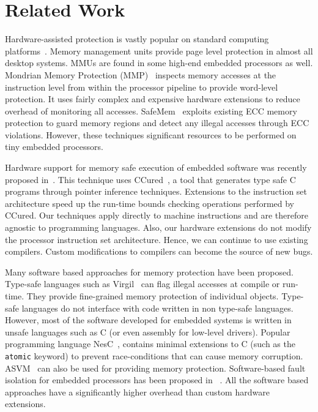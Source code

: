 \section{Related Work}
\label{sec:related}
%
Hardware-assisted protection is vastly popular on standard computing platforms~\cite{qin-hpca05-safemem, witchel-asplos02-mondrian}. 
%
Memory management units provide page level protection in almost all desktop systems.
%
MMUs are found in some high-end embedded processors as well.
%
Mondrian Memory Protection (MMP)~\cite{witchel-asplos02-mondrian} inspects memory accesses at the instruction level from within the processor pipeline to provide word-level protection.
%
It uses fairly complex and expensive hardware extensions to reduce overhead of monitoring all accesses.
%
SafeMem~\cite{qin-hpca05-safemem} exploits existing ECC memory protection to guard memory regions and detect any illegal accesses through ECC violations.
%
However, these techniques significant resources to be performed on tiny embedded processors.

%
Hardware support for memory safe execution of embedded software was recently proposed in~\cite{divya06codes}.
%
This technique uses CCured~\cite{ccured02necula}, a tool that generates type safe C programs through pointer inference techniques.
%
Extensions to the instruction set architecture speed up the run-time bounds checking operations performed by CCured.
%
Our techniques apply directly to machine instructions and are therefore agnostic to programming languages.
%
Also, our hardware extensions do not modify the processor instruction set architecture.
%
Hence, we can continue to use existing compilers.
%
Custom modifications to compilers can become the source of new bugs.
%

Many software based approaches for memory protection have been proposed.
%
Type-safe languages such as Virgil~\cite{titzer06virgil} can flag illegal accesses at compile or run-time.
%
They provide fine-grained memory protection of individual objects.
%
Type-safe languages do not interface with code written in non type-safe languages.
%
However, most of the software developed for embedded systems is written in unsafe languages such as C (or even assembly for low-level drivers). 
%
Popular programming language NesC~\cite{gay03nesc}, contains minimal extensions to C (such as the \texttt{atomic} keyword) to prevent race-conditions that can cause memory corruption.
%
ASVM~\cite{asvm05nsdi} can also be used for providing memory protection. 
%
Software-based fault isolation for embedded processors has been proposed in ~\cite{ram06emnets}.
%
All the software based approaches have a significantly higher overhead than custom hardware extensions.
